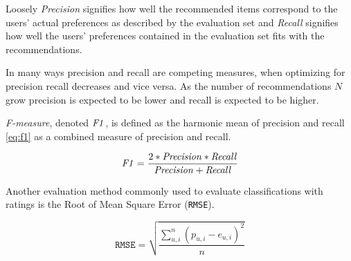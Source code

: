 Loosely \textit{Precision} signifies how well the recommended items correspond to the users' actual preferences as described by the evaluation set and \textit{Recall} signifies how well the users' preferences contained in the evaluation set fits with the recommendations.

In many ways precision and recall are competing measures, when optimizing for precision recall decreases and vice versa.  As the number of recommendations $N$ grow precision is expected to be lower and recall is expected to be higher. \citep{hu2008collaborative}

\textit{F-measure}, denoted $\mathit{F1}$, is defined as the harmonic mean of precision and recall \eqref{eq:f1} as a combined measure of precision and recall.

\begin{equation} \label{eq:f1}
    \mathit{F1} = \frac{2 * \mathit{Precision} * \mathit{Recall}}{\mathit{Precision} + \mathit{Recall}}
\end{equation}

Another evaluation method commonly used to evaluate classifications with ratings is the Root of Mean Square Error (\texttt{RMSE}).
\citep{bobadilla2013recommender}

\begin{equation} \label{eq:rmse}
    \mathtt{RMSE} = \sqrt{\frac{\sum_{u, i}^n (p_{u, i} - e_{u, i})^2}{n}}
\end{equation}

